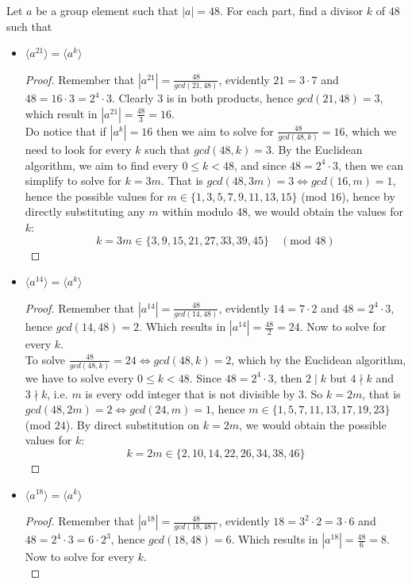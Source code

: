 \begin{assignment}[
  header=HeaderA,
  body=BodyA,
  title={Homework 2},
  duedate={17-February-2026},
  toc=false,
  toctitle={This appears on the Table of contents.},
  exlist=false
]
\begin{exer}[Problem 4.77]
Let $a$ be a group element such that $|a| = 48$. For each part, find a divisor $k$ of $48$ such that
\begin{itemize}
    \item[a.] $\langle a^{21} \rangle = \langle a^k \rangle$
    \begin{proof}
    Remember that $|a^{21}| = \frac{48}{gcd(21,48)}$, evidently $21 = 3\cdot 7$ and $48 = 16\cdot 3 = 2^4 \cdot 3$. Clearly $3$ is in both products, hence $gcd(21,48) = 3$, which result in $|a^{21}| = \frac{48}{3} = 16$.\\
    
    Do notice that if $|a^k| = 16$ then we aim to solve for $\frac{48}{gcd(48,k)} = 16$, which we need to look for every $k$ such that $gcd(48,k) = 3$. By the Euclidean algorithm, we aim to find every $0 \leq k < 48$, and since $48 = 2^4 \cdot 3$, then we can simplify to solve for $k = 3m$. That is $gcd(48,3m) = 3 \iff gcd(16,m) = 1$, hence the possible values for $m \in \{1,3,5,7,9,11,13,15\}$ (mod $16$), hence by directly substituting any $m$ within modulo 48, we would obtain the values for $k$:
    \[
    k = 3m \in \{3,9, 15,21,27,33,39,45\}  \quad (\text{mod } 48)
    \]
    \end{proof}
    \item[b.] $\langle a^{14} \rangle = \langle a^k \rangle$
    \begin{proof}
    Remember that $|a^{14}| = \frac{48}{gcd(14, 48)}$, evidently $14 = 7\cdot 2$ and $48 = 2^4 \cdot 3$, hence $gcd(14,48) = 2$. Which results in $|a^{14}| = \frac{48}{2} = 24$. Now to solve for every $k$.\\

    To solve $\frac{48}{gcd(48,k)} = 24 \iff gcd(48,k) = 2$, which by the Euclidean algorithm, we have to solve every $0 \leq k < 48$. Since $48 = 2^4 \cdot 3$, then $2\mid k$ but $4\nmid k$ and $3\nmid k$, i.e. $m$ is every odd integer that is not divisible by $3$. So $k = 2m$, that is $gcd(48, 2m) = 2 \iff gcd(24, m) = 1$, hence $m \in \{1,5,7,11,13,17,19,23\}$ (mod $24$). By direct substitution on $k = 2m$, we would obtain the possible values for $k$:
    \[
    k = 2m \in \{2,10,14,22,26,34,38,46\}
    \] 
    \end{proof}
    \item[c.] $\langle a^{18} \rangle = \langle a^k \rangle$
    \begin{proof}
    Remember that $|a^{18}| = \frac{48}{gcd(18,48)}$, evidently $18 = 3^2 \cdot 2 = 3 \cdot 6$ and $48 = 2^4 \cdot 3 = 6\cdot 2^3$, hence $gcd(18,48) = 6$. Which results in $|a^{18}| = \frac{48}{6} = 8$. Now to solve for every $k$.\\


\end{proof}
\end{itemize}
\end{exer}
\end{assignment}

